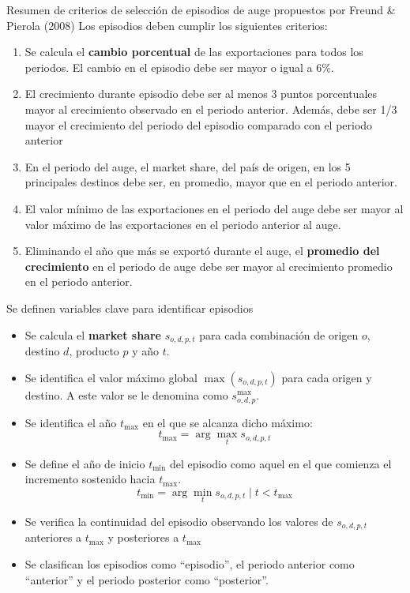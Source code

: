 \documentclass[aspectratio=169,xcolor=dvipsnames]{beamer}
\begin{document}
\begin{frame}{Resumen de criterios de selección de episodios de auge propuestos por Freund \& Pierola (2008)}
Los episodios deben cumplir los siguientes criterios:
\begin{enumerate}
    \item Se calcula el \textbf{cambio porcentual} de las exportaciones para todos los periodos. El  cambio en el episodio debe ser mayor o igual a 6\%.
    \item El crecimiento durante episodio debe ser al menos 3 puntos porcentuales mayor al crecimiento observado en el periodo anterior. Además, debe ser 1/3 mayor el crecimiento del periodo del episodio comparado con el periodo anterior
    \item En el periodo del auge, el market share, del país de origen, en los 5 principales destinos debe ser, en promedio, mayor que en el periodo anterior.
    \item El valor mínimo de las exportaciones en el periodo del auge debe ser mayor al valor máximo de las exportaciones en el periodo anterior al auge.
    \item Eliminando el año que más se exportó durante el auge, el \textbf{promedio del crecimiento} en el periodo de auge debe ser mayor al crecimiento promedio en el periodo anterior.
\end{enumerate}
\end{frame}

\begin{frame}{Se definen variables clave para identificar episodios}
\begin{itemize}
    \item Se calcula el \textbf{market share} \( s_{o,d,p,t} \) para cada combinación de origen \( o \), destino \( d \), producto \( p \) y año \( t \).
    \item Se identifica el valor máximo global \( \max(s_{o,d,p,t}) \) para cada origen y destino. A este valor se le denomina como \( s_{o,d,p}^{\max} \).
    \item Se identifica el año \( t_{\max} \) en el que se alcanza dicho máximo: 
    \[
    t_{\max} = \arg\max_t s_{o,d,p,t}
    \]
    \item Se define el año de inicio \( t_{\min} \) del episodio como aquel en el que comienza el incremento sostenido hacia \( t_{\max} \).
    \[
    t_{\min} = \arg\min_t s_{o,d,p,t}  \mid t < t_{\max}
    \]
    \item Se verifica la continuidad del episodio observando los valores de \( s_{o,d,p,t} \) anteriores a \( t_{\max} \) y posteriores a \( t_{\max} \)
    \item Se clasifican los episodios como ``episodio'', el periodo anterior como ``anterior'' y  el periodo posterior como ``posterior''.
\end{itemize}

\end{frame}
\end{document}
